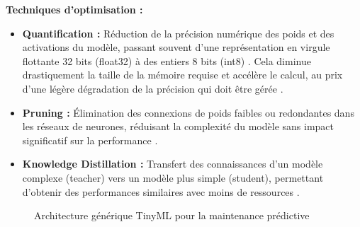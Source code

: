 \textbf{Techniques d'optimisation :}
\begin{itemize}
\item \textbf{Quantification :} Réduction de la précision numérique des poids et des activations du modèle, passant souvent d'une représentation en virgule flottante 32 bits (float32) à des entiers 8 bits (int8) \cite{tsoukas2024,krishnamoorthi2018}. Cela diminue drastiquement la taille de la mémoire requise et accélère le calcul, au prix d'une légère dégradation de la précision qui doit être gérée \cite{arciniegas2025,langer2025}.

\item \textbf{Pruning :} Élimination des connexions de poids faibles ou redondantes dans les réseaux de neurones, réduisant la complexité du modèle sans impact significatif sur la performance \cite{han2015}.

\item \textbf{Knowledge Distillation :} Transfert des connaissances d'un modèle complexe (teacher) vers un modèle plus simple (student), permettant d'obtenir des performances similaires avec moins de ressources \cite{hinton2015}.
\end{itemize}

\begin{figure}[ht]
\centering
{}
\caption{Architecture générique TinyML pour la maintenance prédictive}
\label{fig:tinyml_architecture}
\end{figure}

